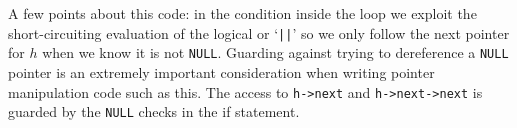 A few points about this code: in the condition inside the loop we
exploit the short-circuiting evaluation of the logical or `\lstinline'||''
so we only follow the next pointer for $h$ when we know it is not
\lstinline'NULL'.  Guarding against trying to dereference a \lstinline'NULL'
pointer is an extremely important consideration when writing
pointer manipulation code such as this.
The access to \lstinline'h->next' and \lstinline'h->next->next' is guarded by
the \lstinline'NULL' checks in the if statement.



